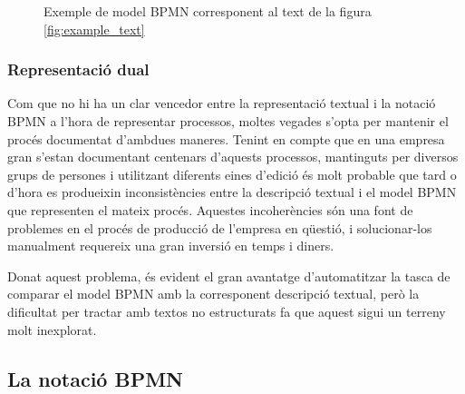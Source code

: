 \begin{figure}
    \begin{center}
    \end{center}
    \caption{Exemple de model BPMN corresponent al text de la figura \ref{fig:example_text}}
    \label{fig:example_bpmn}
\end{figure}

\subsubsection{Representació dual}
Com que no hi ha un clar vencedor entre la representació textual i la notació BPMN a l'hora de representar processos, moltes vegades s'opta per mantenir el procés documentat d'ambdues maneres. Tenint en compte que en una empresa gran s'estan documentant centenars d'aquests processos, mantinguts per diversos grups de persones i utilitzant diferents eines d'edició és molt probable que tard o d'hora es produeixin inconsistències entre la descripció textual i el model BPMN que representen el mateix procés. Aquestes incoherències són una font de problemes en el procés de producció de l'empresa en qüestió, i solucionar-los manualment requereix una gran inversió en temps i diners.

Donat aquest problema, és evident el gran avantatge d'automatitzar la tasca de comparar el model BPMN amb la corresponent descripció textual, però la dificultat per tractar amb textos no estructurats fa que aquest sigui un terreny molt inexplorat. 


\subsection{La notació BPMN}


